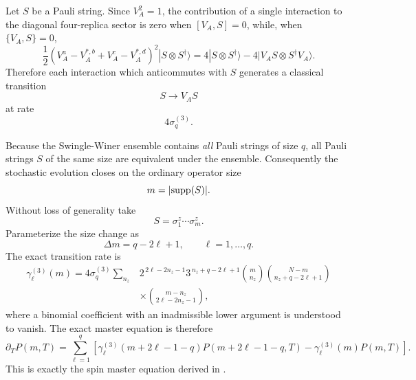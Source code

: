 \documentclass{article}
\theoremstyle{definition}
\begin{document}
Let $S$ be a Pauli string.  Since $V_A^2=1$, the contribution of a single
interaction to the diagonal four-replica sector is zero when
$[V_A,S]=0$, while, when $\{V_A,S\}=0$,
\begin{equation}
    \frac12
    \left(
       V_A^{a}
       -
       V_A^{*,b}
       +
       V_A^{c}
       -
       V_A^{*,d}
    \right)^2
    |S\otimes S^\dagger\rangle
    =
    4|S\otimes S^\dagger\rangle
    -
    4|V_AS\otimes S^\dagger V_A\rangle .
    \label{eq:spinbrown_transition_action}
\end{equation}
Therefore each interaction which anticommutes with $S$ generates a
classical transition
\begin{equation}
    S\longrightarrow V_AS
\end{equation}
at rate
\begin{equation}
    4\sigma_q^{(3)}.
    \label{eq:spinbrown_single_transition_rate}
\end{equation}

Because the Swingle-Winer ensemble contains \emph{all} Pauli strings of
size $q$, all Pauli strings $S$ of the same size are equivalent under the
ensemble.  Consequently the stochastic evolution closes on the ordinary
operator size
\begin{equation}
    m=|{\rm supp}(S)|.
\end{equation}
Without loss of generality take
\begin{equation}
    S=\sigma_1^z\cdots\sigma_m^z.
\end{equation}
Parameterize the size change as
\begin{equation}
    \Delta m=q-2\ell+1,
    \qquad
    \ell=1,\ldots,q.
\end{equation}
The exact transition rate is
\begin{align}
    \gamma_\ell^{(3)}(m)
    =
    4\sigma_q^{(3)}
    \sum_{n_z}
    &
    2^{\,2\ell-2n_z-1}
    3^{\,n_z+q-2\ell+1}
    \binom{m}{n_z}
    \binom{N-m}{n_z+q-2\ell+1}
    \nonumber\\
    &\times
    \binom{m-n_z}{2\ell-2n_z-1},
    \label{eq:spinbrown_SW_gamma_general}
\end{align}
where a binomial coefficient with an inadmissible lower argument is
understood to vanish.  The exact master equation is therefore
\begin{equation}
    \boxed{
    \partial_T P(m,T)
    =
    \sum_{\ell=1}^q
    \left[
       \gamma_\ell^{(3)}
       (m+2\ell-1-q)
       P(m+2\ell-1-q,T)
       -
       \gamma_\ell^{(3)}(m)P(m,T)
    \right].
    }
    \label{eq:spinbrown_SW_master}
\end{equation}
This is exactly the spin master equation derived in \cite{Xu2024}.
\end{document}
